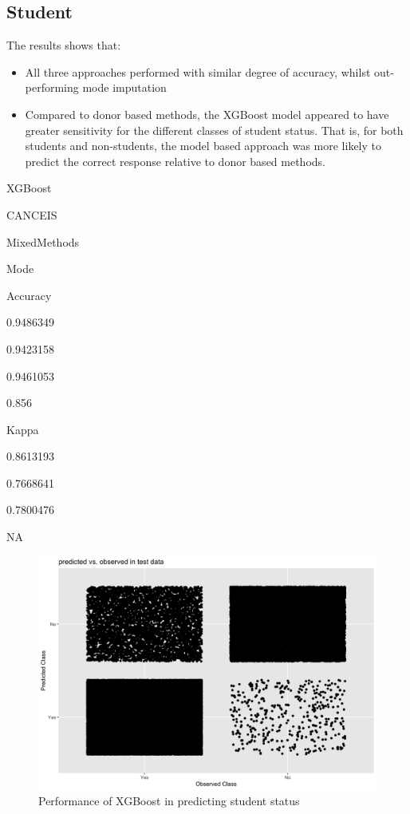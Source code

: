 \documentclass[]{book}
\providecommand{\tightlist}{%
  \setlength{\itemsep}{0pt}\setlength{\parskip}{0pt}}
\begin{document}
\subsection{Student}\label{student}

The results shows that:

\begin{itemize}
\tightlist
\item
  All three approaches performed with similar degree of accuracy, whilst
  out-performing mode imputation\\
\item
  Compared to donor based methods, the XGBoost model appeared to have
  greater sensitivity for the different classes of student status. That
  is, for both students and non-students, the model based approach was
  more likely to predict the correct response relative to donor based
  methods.
\end{itemize}

XGBoost

CANCEIS

MixedMethods

Mode

Accuracy

0.9486349

0.9423158

0.9461053

0.856

Kappa

0.8613193

0.7668641

0.7800476

NA

\begin{figure}
\centering
\includegraphics{images/STXGqplot.png}
\caption{Performance of XGBoost in predicting student status}
\end{figure}
\end{document}
